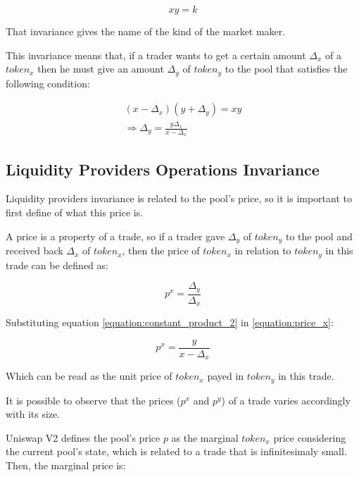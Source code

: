 \documentclass{article}
\begin{document}
\begin{equation}
    \label{equation:constant_product}
    xy=k
\end{equation}

That invariance gives the name of the kind of the market maker.

This invariance means that, if a trader wants to get a certain amount $\Delta_x$ of a $token_x$ then he must give an amount $\Delta_y$ of $token_y$ to the pool that satisfies the following condition:

\begin{equation}
    \label{equation:constant_product_2}
    \begin{split}
        (x - \Delta_x)(y + \Delta_y)=xy \\
        \Rightarrow \Delta_y=\frac{y\Delta_x}{x - \Delta_x}
    \end{split}
\end{equation}

\subsection{Liquidity Providers Operations Invariance}
\label{section:liquidity_providers_invariance}

Liquidity providers invariance is related to the pool's price, so it is important to first define of what this price is.

A price is a property of a trade, so if a trader gave $\Delta_y$ of $token_y$ to the pool and received back $\Delta_x$ of $token_x$, then the price of $token_x$ in relation to $token_y$ in this trade can be defined as:

\begin{equation}
    \label{equation:price_x}
    p^x=\frac{\Delta_y}{\Delta_x}
\end{equation}

Substituting equation \ref{equation:constant_product_2} in \ref{equation:price_x}:

\begin{equation}
    \label{equation:price_x_2}
    p^x=\frac{y}{x-\Delta_x}
\end{equation}

Which can be read as the unit price of $token_x$ payed in $token_y$ in this trade.

It is possible to observe that the prices ($p^x$ and $p^y$) of a trade varies accordingly with its size.

Uniswap V2 defines the pool's price $p$ as the marginal $token_x$ price considering the current pool's state, which is related to a trade that is infinitesimaly small.
Then, the marginal price is:
\end{document}
